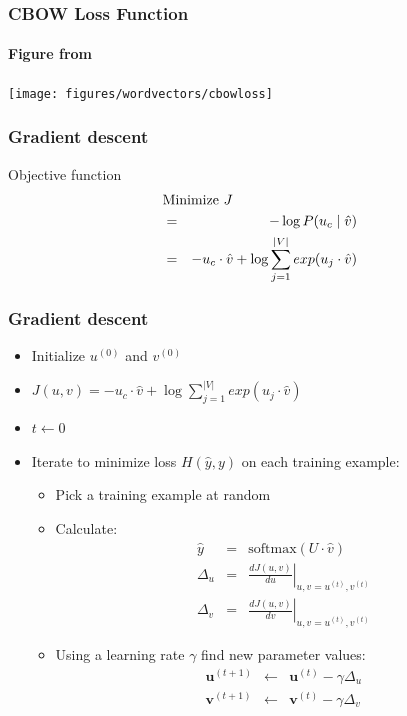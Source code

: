 \begin{frame}
\frametitle{CBOW Loss Function}
\framesubtitle{Figure from \cite{melamud16}}
\texttt{[image: figures/wordvectors/cbowloss]}	
\end{frame}

\begin{frame}
\frametitle{Gradient descent}
\begin{block}{Objective function}
\begin{eqnarray*}
\lefteqn{\textrm{Minimize } J } \\
& = & - \log P(u_c \mid \hat{v}) \\
& = & - u_c \cdot \hat{v} + \log \sum_{j=1}^{|V|} exp(u_j \cdot \hat{v})
\end{eqnarray*}
\end{block}
\end{frame}


\begin{frame}
\frametitle{Gradient descent}
\begin{itemize}[<+->]
\item Initialize $u^{(0)}$ and $v^{(0)}$ 
\item $J(u,v) = - u_c \cdot \hat{v} + \log \sum_{j=1}^{|V|} exp(u_j \cdot \hat{v})$
\item $t \leftarrow 0$
\item Iterate to minimize loss $H(\hat{y}, y)$ on each training example:
\begin{itemize}[<+->]
\item Pick a training example at random
\item Calculate: 
\begin{eqnarray*}
	\hat{y} &=& \textrm{softmax}(U \cdot \hat{v}) \\
	\Delta_u &=& \left. \frac{d J(u,v)}{d u}  \right|_{u,v = u^{(t)}, v^{(t)}} \\
	\Delta_v &=& \left. \frac{d J(u,v)}{d v}  \right|_{u,v = u^{(t)}, v^{(t)}}
\end{eqnarray*}
\item Using a learning rate $\gamma$ find new parameter values:
\begin{eqnarray*}
	\textbf{u}^{(t+1)} &\leftarrow& \textbf{u}^{(t)} - \gamma \Delta_u \\
	\textbf{v}^{(t+1)} &\leftarrow& \textbf{v}^{(t)} - \gamma \Delta_v
\end{eqnarray*}
\end{itemize}
\end{itemize}
\end{frame}

